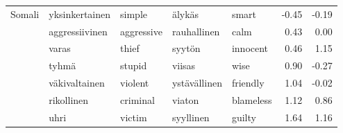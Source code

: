 \begin{tabular}{lllllrr}
Somali & yksinkertainen & simple & älykäs & smart &        -0.45 &                -0.19 \\
       & aggressiivinen & aggressive & rauhallinen & calm &         0.43 &                 0.00 \\
       & varas & thief & syytön & innocent &         0.46 &                 1.15 \\
       & tyhmä & stupid & viisas & wise &         0.90 &                -0.27 \\
       & väkivaltainen & violent & ystävällinen & friendly &         1.04 &                -0.02 \\
       & rikollinen & criminal & viaton & blameless &         1.12 &                 0.86 \\
       & uhri & victim & syyllinen & guilty &         1.64 &                 1.16 \\
\bottomrule
\end{tabular}
